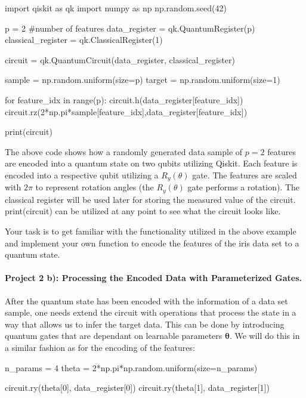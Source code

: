 \documentclass[%
oneside,                 %
final,                   %
10pt]{article}
\begin{document}
\bpycod
import qiskit as qk
import numpy as np
np.random.seed(42)

p = 2 #number of features
data_register = qk.QuantumRegister(p)
classical_register = qk.ClassicalRegister(1)

circuit = qk.QuantumCircuit(data_register, classical_register)

sample = np.random.uniform(size=p)
target = np.random.uniform(size=1)

for feature_idx in range(p):
    circuit.h(data_register[feature_idx])
    circuit.rz(2*np.pi*sample[feature_idx],data_register[feature_idx])

print(circuit)

\epycod


The above code shows how a randomly generated data sample of $p=2$
features are encoded into a quantum state on two qubits utilizing
Qiskit. Each feature is encoded into a respective qubit utilizing a
$R_y(\theta)$ gate. The features are scaled with $2\pi$ to represent
rotation angles (the $R_y(\theta)$ gate performs a rotation). The
classical register will be used later for storing the measured value
of the circuit.  print(circuit) can be utilized at any point to see
what the circuit looks like.

Your task is to get familiar with the functionality utilized in the
above example and implement your own function to encode the
features of the iris data set to a quantum state.

\paragraph{Project 2 b): Processing the Encoded Data with Parameterized Gates.}
After the quantum state has been encoded with the information of a data set sample, one needs extend the circuit with operations that process the state in a way that allows us to infer the target data. This can be done by introducing quantum gates that are dependant on learnable parameters $\boldsymbol{\theta}$. We will do this in a similar fashion as for the encoding of the features:
















\bpycod
n_params = 4
theta = 2*np.pi*np.random.uniform(size=n_params)

circuit.ry(theta[0], data_register[0])
circuit.ry(theta[1], data_register[1])
\end{document}
